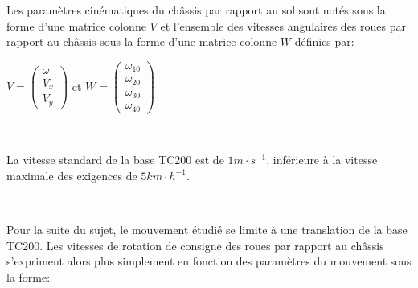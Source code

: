 Les paramètres cinématiques du châssis par rapport au sol sont notés sous la forme d'une matrice colonne $V$ et l'ensemble des vitesses angulaires des roues par rapport au châssis sous la forme d'une matrice colonne $W$ définies par:

\begin{center}
$V=\left(\begin{array}{c}
\omega \\ V_x \\ V_y
\end{array}\right)$ et $W=\left(\begin{array}{c}
\omega_{10} \\ \omega_{20} \\ \omega_{30} \\ \omega_{40}
\end{array}\right)$
\end{center}


~\

La vitesse standard de la base TC200 est de $1m\cdot s^{-1}$, inférieure à la vitesse maximale des exigences de $5km\cdot h^{-1}$.


~\

Pour la suite du sujet, le mouvement étudié se limite à une translation de la base TC200. Les vitesses de rotation de consigne des roues par rapport au châssis s'expriment alors plus simplement en fonction des paramètres du
mouvement sous la forme:

